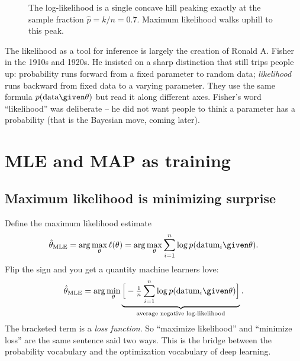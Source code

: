 \begin{figure}[H]
\centering
{}
\caption{The log-likelihood is a single concave hill peaking exactly at the
sample fraction $\hat p = k/n = 0.7$. Maximum likelihood walks uphill to this
peak.}
\label{ch34:fig-loglik}
\end{figure}

\begin{historybox}
The likelihood as a tool for inference is largely the creation of Ronald A.
Fisher in the 1910s and 1920s. He insisted on a sharp distinction that still
trips people up: probability runs forward from a fixed parameter to random data;
\emph{likelihood} runs backward from fixed data to a varying parameter. They use
the same formula $p(\text{data}\given\theta)$ but read it along different axes.
Fisher's word ``likelihood'' was deliberate -- he did not want people to think a
parameter has a probability (that is the Bayesian move, coming later).
\end{historybox}

\section{MLE and MAP as training}
\label{ch34:mle-map}

\subsection{Maximum likelihood is minimizing surprise}

Define the maximum likelihood estimate
\[
  \hat\theta_{\text{MLE}} = \arg\max_\theta \ell(\theta)
                          = \arg\max_\theta \sum_{i=1}^n \log p(\text{datum}_i\given\theta).
\]
Flip the sign and you get a quantity machine learners love:
\[
  \hat\theta_{\text{MLE}} = \arg\min_\theta \underbrace{\Big[-\tfrac{1}{n}\sum_{i=1}^n \log p(\text{datum}_i\given\theta)\Big]}_{\text{average negative log-likelihood}}.
\]
The bracketed term is a \emph{loss function}. So ``maximize likelihood'' and
``minimize loss'' are the same sentence said two ways. This is the bridge between
the probability vocabulary and the optimization vocabulary of deep learning.

